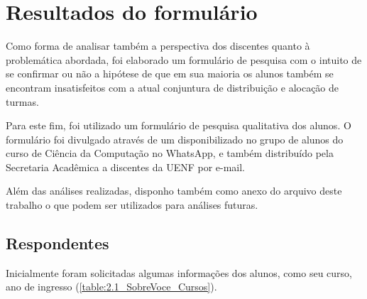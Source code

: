 \begin{apendicesenv} \label{chap:apendice} %

  \chapter{Resultados do formulário} \label{chap:Formulário de pesquisa}

  Como forma de analisar também a perspectiva dos discentes quanto à problemática abordada, foi elaborado um formulário de pesquisa com o intuito de se confirmar ou não a hipótese de que em sua maioria os alunos também se encontram insatisfeitos com a atual conjuntura de distribuição e alocação de turmas.

  Para este fim, foi utilizado um formulário de pesquisa qualitativa dos alunos. O formulário foi divulgado através de um  disponibilizado no grupo de alunos do curso de Ciência da Computação no WhatsApp, e também distribuído pela Secretaria Acadêmica a discentes da UENF por e-mail.

  Além das análises realizadas, disponho também como anexo do arquivo deste trabalho o
  que podem ser utilizados para análises futuras.


  \section*{Respondentes} \label{sec:Respondentes}

  Inicialmente foram solicitadas algumas informações dos alunos, como seu curso, ano de ingresso (\autoref{table:2.1_SobreVoce_Cursos}).


\end{apendicesenv}
